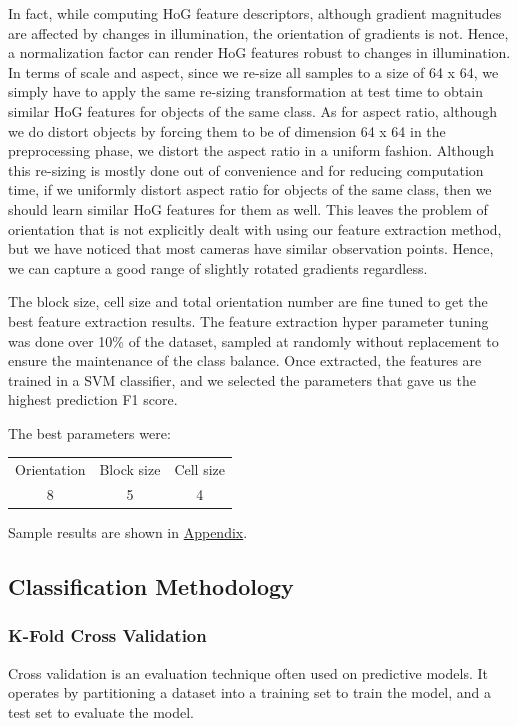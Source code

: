 \documentclass[12pt]{article}
\begin{document}
In fact, while computing HoG feature descriptors, although gradient magnitudes are affected by changes in illumination, the orientation of gradients is not. Hence, a normalization factor can render HoG features robust to changes in illumination. In terms of scale and aspect, since we re-size all samples to a size of 64 x 64, we simply have to apply the same re-sizing transformation at test time to obtain similar HoG features for objects of the same class. As for aspect ratio, although we do distort objects by forcing them to be of dimension 64 x 64 in the preprocessing phase, we distort the aspect ratio in a uniform fashion. Although this re-sizing is mostly done out of convenience and for reducing computation time, if we uniformly distort aspect ratio for objects of the same class, then we should learn similar HoG features for them as well. This leaves the problem of orientation that is not explicitly dealt with using our feature extraction method, but we have noticed that most cameras have similar observation points. Hence, we can capture a good range of slightly rotated gradients regardless.

The block size, cell size and total orientation number are fine tuned to get the best feature extraction results. 
The feature extraction hyper parameter tuning was done over 10\% of the dataset, sampled at randomly without replacement to ensure the maintenance of the class balance. 
Once extracted, the features are trained in a SVM classifier, and we selected the parameters that gave us the highest prediction F1 score. 

The best parameters were: 

\begin{tabular}{ c | c | c }
   Orientation & Block size & Cell size \\
   8 & 5 & 4 
\end{tabular}

Sample results are shown in \hyperref[appendix:HoG]{Appendix}.

\subsection{Classification Methodology}

\subsubsection{K-Fold Cross Validation}
Cross validation is an evaluation technique often used on predictive models. It operates by partitioning a dataset into a training set to train the model, and a test set to evaluate the model.
\end{document}
